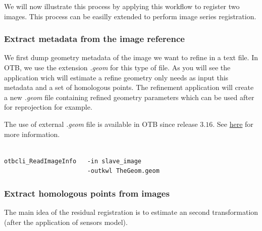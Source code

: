 \begin{center}
     \end{center}


We will now illustrate this process by applying this workflow to register two
images. This process can be easilly extended to perform image series
registration.


\subsubsection{Extract metadata from the image reference}

We first dump geometry metadata of the image we want to refine in a text
file. In OTB, we use the extension \textit{.geom} for this type of file. As you
will see the application wich will estimate a refine geometry only needs as
input this metadata and a set of homologous points. The refinement application
will create a new \textit{.geom} file containing refined geometry parameters
which can be used after for reprojection for example.

The use of external \textit{.geom} file is available in OTB since release
$3.16$. See
\href{http://wiki.orfeo-toolbox.org/index.php/ExtendedFileName}{here} for more
information.

\begin{verbatim}

otbcli_ReadImageInfo   -in slave_image
                       -outkwl TheGeom.geom

\end{verbatim}


\subsubsection{Extract homologous points from images}

The main idea of the residual registration is to estimate an second
transformation (after the application of sensors model).

